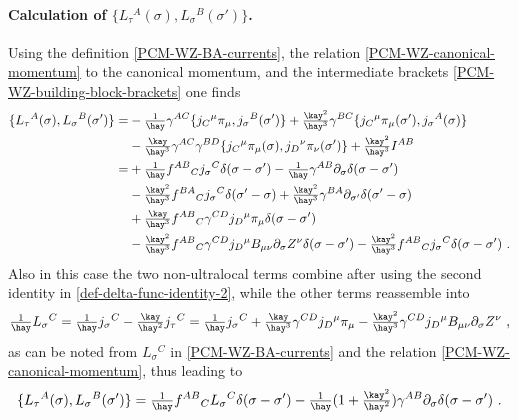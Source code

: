 \documentclass[12pt]{article}
\numberwithin{equation}{section}
\begin{document}
\paragraph{Calculation of $\{L_{\tau}{}^{A}(\sigma),L_{\sigma}{}^{B}(\sigma')\}$.} Using the definition \eqref{PCM-WZ-BA-currents}, the relation \eqref{PCM-WZ-canonical-momentum} to the canonical momentum, and the intermediate brackets \eqref{PCM-WZ-building-block-brackets} one finds
\begin{align}
\{L_{\tau}{}^{A}(\sigma),L_{\sigma}{}^{B}(\sigma')\}=&-\tfrac{1}{\hay}\gamma^{AC}\{j_{C}{}^{\mu}\pi_{\mu},j_{\sigma}{}^{B}(\sigma')\}+\tfrac{\kay^2}{\hay^3}\gamma^{BC}\{j_{C}{}^{\mu}\pi_{\mu}(\sigma'),j_{\sigma}{}^{A}(\sigma)\}
\notag \\
&-\tfrac{\kay}{\hay^3}\gamma^{AC}\gamma^{BD}\{j_{C}{}^{\mu}\pi_{\mu}(\sigma),j_{D}{}^{\nu}\pi_{\nu}(\sigma')\}+\tfrac{\kay^2}{\hay^3}I^{AB}
\notag\\
=&+\tfrac{1}{\hay}f^{AB}{}_{C}j_{\sigma}{}^{C}\delta(\sigma-\sigma')-\tfrac{1}{\hay}\gamma^{AB}\partial_{\sigma}\delta(\sigma-\sigma')
\\
&-\tfrac{\kay^2}{\hay^3}f^{BA}{}_{C}j_{\sigma}{}^{C}\delta(\sigma'-\sigma)+\tfrac{\kay^2}{\hay^3}\gamma^{BA}\partial_{\sigma'}\delta(\sigma'-\sigma)
\notag \\
&+\tfrac{\kay}{\hay^3}f^{AB}{}_{C}\gamma^{CD}j_{D}{}^{\mu}\pi_{\mu}\delta(\sigma-\sigma')
\notag \\
&-\tfrac{\kay^2}{\hay^3}f^{AB}{}_{C}\gamma^{CD}j_{D}{}^{\mu}B_{\mu\nu}\partial_{\sigma}Z^{\nu}\delta(\sigma-\sigma')-\tfrac{\kay^2}{\hay^3}f^{AB}{}_{C}j_{\sigma}{}^{C}\delta(\sigma-\sigma') \,\, .
\notag
\end{align}
Also in this case the two non-ultralocal terms combine after using the second identity in \eqref{def-delta-func-identity-2}, while the other terms reassemble into
\begin{equation}
\tfrac{1}{\hay}L_{\sigma}{}^{C}=\tfrac{1}{\hay}j_{\sigma}{}^{C}-\tfrac{\kay}{\hay^2}j_{\tau}{}^{C}=\tfrac{1}{\hay}j_{\sigma}{}^{C}+\tfrac{\kay}{\hay^3}\gamma^{CD}j_{D}{}^{\mu}\pi_{\mu}-\tfrac{\kay^2}{\hay^3}\gamma^{CD}j_{D}{}^{\mu}B_{\mu\nu}\partial_{\sigma}Z^{\nu} \,\, ,
\end{equation}
as can be noted from $L_{\sigma}{}^{C}$ in \eqref{PCM-WZ-BA-currents} and the relation \eqref{PCM-WZ-canonical-momentum}, thus leading to
\begin{equation}
\{L_{\tau}{}^{A}(\sigma),L_{\sigma}{}^{B}(\sigma')\} = \tfrac{1}{\hay}f^{AB}{}_{C}L_{\sigma}{}^{C}\delta(\sigma-\sigma')-\tfrac{1}{\hay}(1+\tfrac{\kay^2}{\hay^2})\gamma^{AB}\partial_{\sigma}\delta(\sigma-\sigma') \,\, .
\end{equation}
\end{document}
